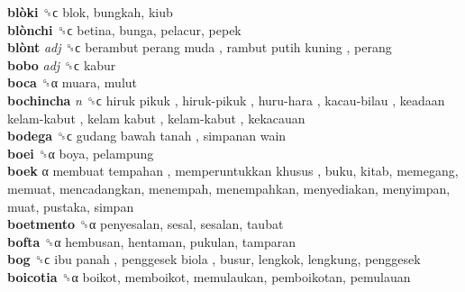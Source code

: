 \textbf{blòki} ␝ϲ  blok, bungkah, kiub  \\
\textbf{blònchi} ␝ϲ  betina, bunga, pelacur, pepek  \\
\textbf{blònt} \emph{adj}  ␝ϲ   berambut perang muda ,  rambut putih kuning , perang  \\
\textbf{bobo} \emph{adj}  ␝ϲ  kabur  \\
\textbf{boca} ␝α  muara, mulut  \\
\textbf{bochincha} \emph{n}  ␝ϲ   hiruk pikuk ,  hiruk-pikuk ,  huru-hara ,  kacau-bilau ,  keadaan kelam-kabut ,  kelam kabut ,  kelam-kabut , kekacauan  \\
\textbf{bodega} ␝ϲ   gudang bawah tanah ,  simpanan wain   \\
\textbf{boei} ␝α  boya, pelampung  \\
\textbf{boek} α   membuat tempahan ,  memperuntukkan khusus , buku, kitab, memegang, memuat, mencadangkan, menempah, menempahkan, menyediakan, menyimpan, muat, pustaka, simpan  \\
\textbf{boetmento} ␝α  penyesalan, sesal, sesalan, taubat  \\
\textbf{bofta} ␝α  hembusan, hentaman, pukulan, tamparan  \\
\textbf{bog} ␝ϲ   ibu panah ,  penggesek biola , busur, lengkok, lengkung, penggesek  \\
\textbf{boicotia} ␝α  boikot, memboikot, memulaukan, pemboikotan, pemulauan  \\
